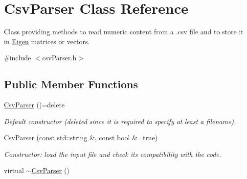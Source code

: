 \hypertarget{classCsvParser}{\section{Csv\-Parser Class Reference}
\label{classCsvParser}
}


Class providing methods to read numeric content from a .csv file and to store it in \hyperlink{index_Eigen}{Eigen} matrices or vectors.  




{\ttfamily \#include $<$csv\-Parser.\-h$>$}

\subsection*{Public Member Functions}
\begin{DoxyCompactItemize}
\item 
\hypertarget{classCsvParser_a9694abc21c2bc6d593a2489f6896ca10}{\hyperlink{classCsvParser_a9694abc21c2bc6d593a2489f6896ca10}{Csv\-Parser} ()=delete}\label{classCsvParser_a9694abc21c2bc6d593a2489f6896ca10}

\begin{DoxyCompactList}\small\item\em Default constructor (deleted since it is required to specify at least a filename). \end{DoxyCompactList}\item 
\hyperlink{classCsvParser_a928811b407ea6816bab9fef75d504301}{Csv\-Parser} (const std\-::string \&, const bool \&=true)
\begin{DoxyCompactList}\small\item\em Constructor\-: load the input file and check its compatibility with the code. \end{DoxyCompactList}\item 
\hypertarget{classCsvParser_a73aa36f7e9a832f184c98873c930e83e}{virtual \hyperlink{classCsvParser_a73aa36f7e9a832f184c98873c930e83e}{$\sim$\-Csv\-Parser} ()}\label{classCsvParser_a73aa36f7e9a832f184c98873c930e83e}


\end{DoxyCompactItemize}
